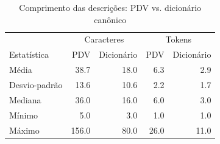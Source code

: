 \begin{table}[htbp]
\centering
\caption{Comprimento das descrições: PDV vs. dicionário canônico}
\label{tab:comprimento-descricoes}
\small
\begin{tabular}{lrrrr}
\toprule
 & \multicolumn{2}{c}{Caracteres} & \multicolumn{2}{c}{Tokens} \\
Estatística & PDV & Dicionário & PDV & Dicionário \\
\midrule
Média & 38.7 & 18.0 & 6.3 & 2.9 \\
Desvio-padrão & 13.6 & 10.6 & 2.2 & 1.7 \\
Mediana & 36.0 & 16.0 & 6.0 & 3.0 \\
Mínimo & 5.0 & 3.0 & 1.0 & 1.0 \\
Máximo & 156.0 & 80.0 & 26.0 & 11.0 \\
\bottomrule
\end{tabular}
\vspace{2mm}
\end{table}
